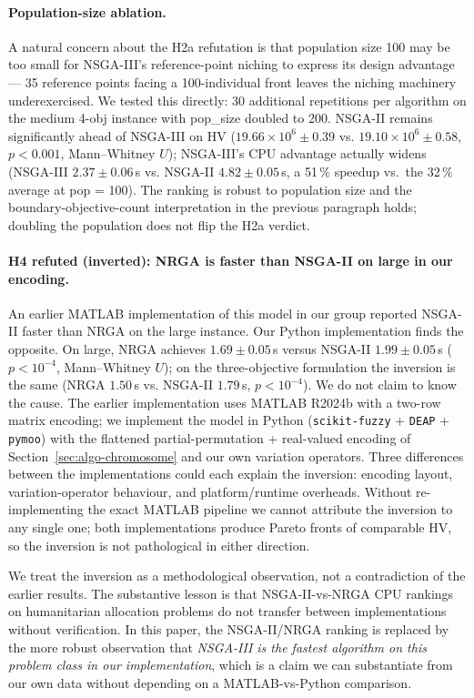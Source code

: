 \documentclass[applsci,article,submit,moreauthors,pdftex]{Definitions/mdpi}
\begin{document}
\paragraph{Population-size ablation.}
A natural concern about the H2a refutation is that population size 100
may be too small for NSGA-III's reference-point niching to express its
design advantage --- 35 reference points facing a 100-individual
front leaves the niching machinery underexercised. We tested this
directly: 30 additional repetitions per algorithm on the medium 4-obj
instance with pop\_size doubled to 200. NSGA-II remains significantly
ahead of NSGA-III on HV ($19.66 \times 10^6 \pm 0.39$ vs.
$19.10 \times 10^6 \pm 0.58$, $p < 0.001$, Mann--Whitney $U$);
NSGA-III's CPU advantage actually widens (NSGA-III $2.37 \pm 0.06$\,s
vs. NSGA-II $4.82 \pm 0.05$\,s, a 51\,\% speedup vs.\ the 32\,\%
average at pop = 100). The ranking is robust to population size and
the boundary-objective-count interpretation in the previous paragraph
holds; doubling the population does not flip the H2a verdict.

\paragraph{H4 refuted (inverted): NRGA is faster than NSGA-II on large in
our encoding.} An earlier MATLAB implementation of this model in our group
reported NSGA-II faster than NRGA on the large instance. Our Python
implementation finds the opposite.
On large, NRGA achieves $1.69 \pm 0.05$\,s versus NSGA-II $1.99 \pm 0.05$\,s
($p < 10^{-4}$, Mann--Whitney $U$); on the three-objective formulation the
inversion is the same (NRGA $1.50$\,s vs. NSGA-II $1.79$\,s,
$p < 10^{-4}$). We do not claim to know the cause. The earlier
implementation uses MATLAB R2024b with a two-row matrix encoding;
we implement the model in Python (\texttt{scikit-fuzzy} + \texttt{DEAP}
+ \texttt{pymoo}) with the flattened partial-permutation + real-valued
encoding of Section~\ref{sec:algo-chromosome} and our own variation
operators. Three differences between the implementations could each
explain the inversion: encoding layout, variation-operator behaviour,
and platform/runtime overheads. Without re-implementing the exact
MATLAB pipeline we cannot attribute the inversion to any single one;
both implementations produce Pareto fronts of comparable HV, so the
inversion is not pathological in either direction.

We treat the inversion as a methodological observation, not a contradiction
of the earlier results. The substantive lesson is that NSGA-II-vs-NRGA CPU
rankings on humanitarian allocation problems do not transfer between
implementations without verification. In this paper, the NSGA-II/NRGA
ranking is replaced by the more robust
observation that \emph{NSGA-III is the fastest algorithm on this problem
class in our implementation}, which is a claim we can substantiate from
our own data without depending on a MATLAB-vs-Python comparison.
\end{document}
